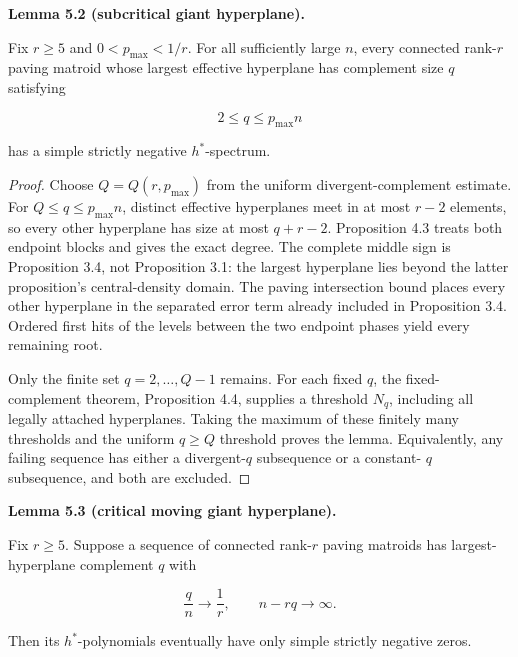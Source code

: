 \documentclass[10pt]{article}
\newenvironment{mdstatement}[1]
  {\par\Needspace{0.16\textheight}\noindent\textbf{#1.}\ \itshape}
  {\par\normalfont}
\begin{document}
\begin{mdstatement}{Lemma 5.2 (subcritical giant hyperplane)}


Fix $r\ge5$ and $0<p_{\max}<1/r$.  For all sufficiently large $n$, every
connected rank-$r$ paving matroid whose largest effective hyperplane has
complement size $q$ satisfying

\[
 2\le q\le p_{\max}n \tag{5.3}
\]

has a simple strictly negative $h^*$-spectrum.

\end{mdstatement}

\begin{proof}


Choose $Q=Q(r,p_{\max})$ from the uniform divergent-complement estimate.
For $Q\le q\le p_{\max}n$, distinct effective hyperplanes meet in at most
$r-2$ elements, so every other hyperplane has size at most $q+r-2$.
Proposition 4.3 treats both endpoint blocks and gives the exact degree.  The
complete middle sign is Proposition 3.4, not Proposition 3.1: the largest
hyperplane lies beyond the latter proposition's central-density domain.
The paving intersection bound places every other hyperplane in the separated
error term already included in Proposition 3.4.  Ordered first hits of the
levels between the two endpoint phases yield every remaining root.

Only the finite set $q=2,\ldots,Q-1$ remains.  For each fixed $q$, the
fixed-complement theorem, Proposition 4.4, supplies a threshold $N_q$, including all
legally attached hyperplanes.  Taking the maximum of these finitely many
thresholds and the uniform $q\ge Q$ threshold proves the lemma.  Equivalently,
any failing sequence has either a divergent-$q$ subsequence or a constant-
$q$ subsequence, and both are excluded.
\end{proof}


\begin{mdstatement}{Lemma 5.3 (critical moving giant hyperplane)}


Fix $r\ge5$.  Suppose a sequence of connected rank-$r$ paving matroids has
largest-hyperplane complement $q$ with

\[
 \frac qn\longrightarrow\frac1r,
 \qquad n-rq\longrightarrow\infty. \tag{5.4}
\]

Then its $h^*$-polynomials eventually have only simple strictly negative
zeros.

\end{mdstatement}
\end{document}
